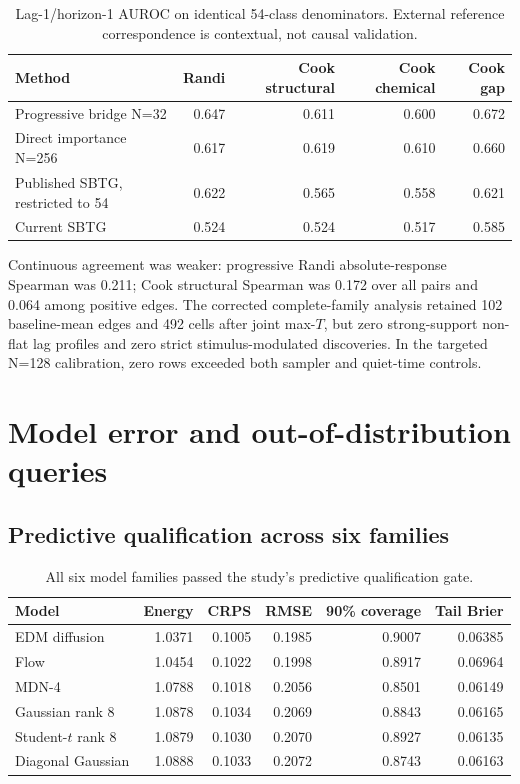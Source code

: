 \documentclass[10pt]{article}
\begin{document}
\begin{table}[H]
\centering\small
\begin{tabular}{lrrrr}
\toprule
Method & Randi & Cook structural & Cook chemical & Cook gap \\
\midrule
Progressive bridge N=32 & 0.647 & 0.611 & 0.600 & 0.672 \\
Direct importance N=256 & 0.617 & 0.619 & 0.610 & 0.660 \\
Published SBTG, restricted to 54 & 0.622 & 0.565 & 0.558 & 0.621 \\
Current SBTG & 0.524 & 0.524 & 0.517 & 0.585 \\
\bottomrule
\end{tabular}
\caption{Lag-1/horizon-1 AUROC on identical 54-class denominators. External reference correspondence is contextual, not causal validation.}
\end{table}

Continuous agreement was weaker: progressive Randi absolute-response Spearman was 0.211; Cook structural Spearman was 0.172 over all pairs and 0.064 among positive edges. The corrected complete-family analysis retained 102 baseline-mean edges and 492 cells after joint max-$T$, but zero strong-support non-flat lag profiles and zero strict stimulus-modulated discoveries. In the targeted N=128 calibration, zero rows exceeded both sampler and quiet-time controls.

\section{Model error and out-of-distribution queries}

\subsection{Predictive qualification across six families}

\begin{table}[H]
\centering\footnotesize
\begin{tabular}{lrrrrr}
\toprule
Model & Energy & CRPS & RMSE & 90\% coverage & Tail Brier \\
\midrule
EDM diffusion & 1.0371 & 0.1005 & 0.1985 & 0.9007 & 0.06385 \\
Flow & 1.0454 & 0.1022 & 0.1998 & 0.8917 & 0.06964 \\
MDN-4 & 1.0788 & 0.1018 & 0.2056 & 0.8501 & 0.06149 \\
Gaussian rank 8 & 1.0878 & 0.1034 & 0.2069 & 0.8843 & 0.06165 \\
Student-$t$ rank 8 & 1.0879 & 0.1030 & 0.2070 & 0.8927 & 0.06135 \\
Diagonal Gaussian & 1.0888 & 0.1033 & 0.2072 & 0.8743 & 0.06163 \\
\bottomrule
\end{tabular}
\caption{All six model families passed the study's predictive qualification gate.}
\end{table}
\end{document}

